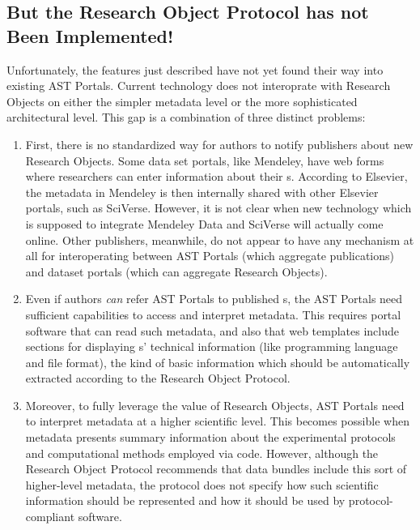 \documentclass[10pt,letterpaper]{article}
\begin{document}
\subsection{But the Research Object Protocol has not Been Implemented!}
Unfortunately, the {\RO} features just described 
have not yet found their way into existing AST  
Portals.  Current technology does not 
interoprate with Research Objects on either 
the simpler metadata level or the more sophisticated 
architectural level.  This gap is a combination 
of three distinct problems:
\p{}
\begin{enumerate}
\item First, there is no standardized way for authors 
to notify publishers about new Research Objects.  
Some data set portals, like Mendeley, have 
web forms where researchers can enter information 
about their {\RO}s.  According to Elsevier, 
the metadata in Mendeley is then internally shared 
with other Elsevier portals, such as SciVerse.  
However, it is not clear when new technology 
which is supposed to integrate Mendeley Data and 
SciVerse will actually come online.  
Other publishers, meanwhile, do not appear to have 
any mechanism at all for interoperating between 
AST Portals (which aggregate publications) and 
dataset portals (which can aggregate Research Objects).

\item Even if authors \textit{can} refer AST Portals 
to published {\RO}s, the AST Portals 
need sufficient capabilities to access and 
interpret {\RO} metadata.  This 
requires portal software that can read such metadata, 
and also that web templates include sections for 
displaying {\RO}s' technical information 
(like programming language and file format), 
the kind of basic information which should be automatically 
extracted according to the Research Object Protocol.

\item Moreover, to fully leverage the value 
of Research Objects, AST Portals need to interpret 
{\RO} metadata at a higher scientific level.  
This becomes possible when {\RO} metadata 
presents summary information about the 
experimental protocols and computational 
methods employed via {\RO} code.  
However, although the Research Object Protocol 
recommends that data bundles include 
this sort of higher-level metadata, 
the protocol does not specify how 
such scientific information should 
be represented and how it should be used 
by protocol-compliant software.  
\end{enumerate} 
 
\end{document}
